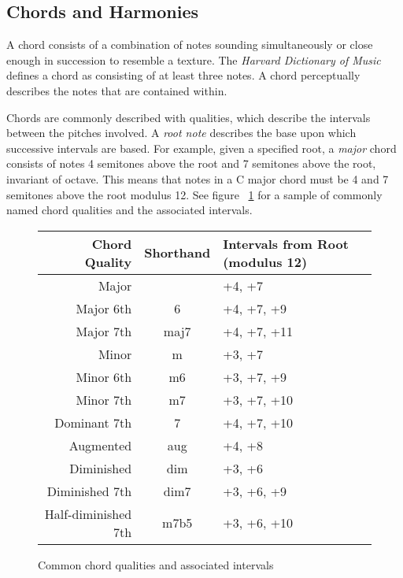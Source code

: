 \subsection{Chords and Harmonies}

A chord consists of a combination of notes sounding simultaneously or close enough in succession to resemble a texture. The \textit{Harvard Dictionary of Music} defines a chord as consisting of at least three notes\cite{harvdict}. A chord perceptually describes the notes that are contained within.

Chords are commonly described with qualities, which describe the intervals between the pitches involved. A \textit{root note} describes the base upon which successive intervals are based. For example, given a specified root, a \textit{major} chord consists of notes 4 semitones above the root and 7 semitones above the root, invariant of octave. This means that notes in a C major chord must be 4 and 7 semitones above the root modulus 12. See figure ~\ref{fig:qualitytable} for a sample of commonly named chord qualities and the associated intervals.

\begin{figure}[h!]
\begin{center}
\begin{tabular}{rcl}
\toprule
Chord Quality       & Shorthand & Intervals from Root (modulus 12) \\
\midrule
Major               &           & +4, +7 \\
Major 6th           & 6         & +4, +7, +9 \\
Major 7th           & maj7      & +4, +7, +11 \\
Minor               & m         & +3, +7 \\
Minor 6th           & m6        & +3, +7, +9 \\
Minor 7th           & m7        & +3, +7, +10 \\
Dominant 7th        & 7         & +4, +7, +10 \\
Augmented           & aug       & +4, +8 \\
Diminished          & dim       & +3, +6 \\
Diminished 7th      & dim7      & +3, +6, +9 \\
Half-diminished 7th & m7b5      & +3, +6, +10 \\
\bottomrule
\end{tabular}
\caption{Common chord qualities and associated intervals}
\label{fig:qualitytable}
\end{center}
\end{figure}

